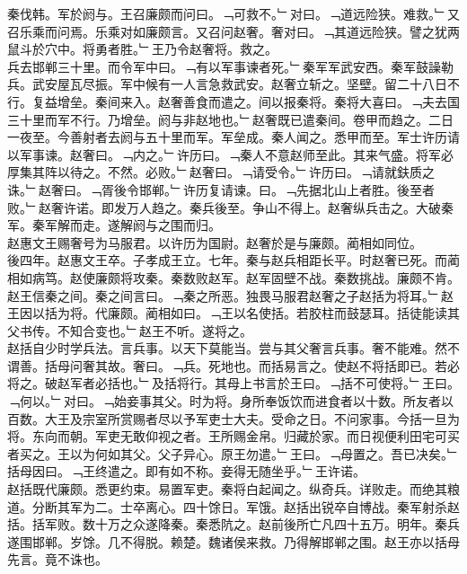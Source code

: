 \documentclass{zhvt-classic}
\begin{document}
\hspace*{2em}秦伐韩。军於阏与。王召廉颇而问曰。﹁可救不。﹂对曰。﹁道远险狭。难救。﹂又召乐乘而问焉。乐乘对如廉颇言。又召问赵奢。奢对曰。﹁其道远险狭。譬之犹两鼠斗於穴中。将勇者胜。﹂王乃令赵奢将。救之。\\
\hspace*{2em}兵去邯郸三十里。而令军中曰。﹁有以军事谏者死。﹂秦军军武安西。秦军鼓譟勒兵。武安屋瓦尽振。军中候有一人言急救武安。赵奢立斩之。坚壁。留二十八日不行。复益增垒。秦间来入。赵奢善食而遣之。间以报秦将。秦将大喜曰。﹁夫去国三十里而军不行。乃增垒。阏与非赵地也。﹂赵奢既已遣秦间。卷甲而趋之。二日一夜至。今善射者去阏与五十里而军。军垒成。秦人闻之。悉甲而至。军士许历请以军事谏。赵奢曰。﹁内之。﹂许历曰。﹁秦人不意赵师至此。其来气盛。将军必厚集其阵以待之。不然。必败。﹂赵奢曰。﹁请受令。﹂许历曰。﹁请就鈇质之诛。﹂赵奢曰。﹁胥後令邯郸。﹂许历复请谏。曰。﹁先据北山上者胜。後至者败。﹂赵奢许诺。即发万人趋之。秦兵後至。争山不得上。赵奢纵兵击之。大破秦军。秦军解而走。遂解阏与之围而归。\\
\hspace*{2em}赵惠文王赐奢号为马服君。以许历为国尉。赵奢於是与廉颇。蔺相如同位。\\
\hspace*{2em}後四年。赵惠文王卒。子孝成王立。七年。秦与赵兵相距长平。时赵奢已死。而蔺相如病笃。赵使廉颇将攻秦。秦数败赵军。赵军固壁不战。秦数挑战。廉颇不肯。赵王信秦之间。秦之间言曰。﹁秦之所恶。独畏马服君赵奢之子赵括为将耳。﹂赵王因以括为将。代廉颇。蔺相如曰。﹁王以名使括。若胶柱而鼓瑟耳。括徒能读其父书传。不知合变也。﹂赵王不听。遂将之。\\
\hspace*{2em}赵括自少时学兵法。言兵事。以天下莫能当。尝与其父奢言兵事。奢不能难。然不谓善。括母问奢其故。奢曰。﹁兵。死地也。而括易言之。使赵不将括即已。若必将之。破赵军者必括也。﹂及括将行。其母上书言於王曰。﹁括不可使将。﹂王曰。﹁何以。﹂对曰。﹁始妾事其父。时为将。身所奉饭饮而进食者以十数。所友者以百数。大王及宗室所赏赐者尽以予军吏士大夫。受命之日。不问家事。今括一旦为将。东向而朝。军吏无敢仰视之者。王所赐金帛。归藏於家。而日视便利田宅可买者买之。王以为何如其父。父子异心。原王勿遣。﹂王曰。﹁母置之。吾已决矣。﹂括母因曰。﹁王终遣之。即有如不称。妾得无随坐乎。﹂王许诺。\\
\hspace*{2em}赵括既代廉颇。悉更约束。易置军吏。秦将白起闻之。纵奇兵。详败走。而绝其粮道。分断其军为二。士卒离心。四十馀日。军饿。赵括出锐卒自博战。秦军射杀赵括。括军败。数十万之众遂降秦。秦悉阬之。赵前後所亡凡四十五万。明年。秦兵遂围邯郸。岁馀。几不得脱。赖楚。魏诸侯来救。乃得解邯郸之围。赵王亦以括母先言。竟不诛也。\\
\end{document}
